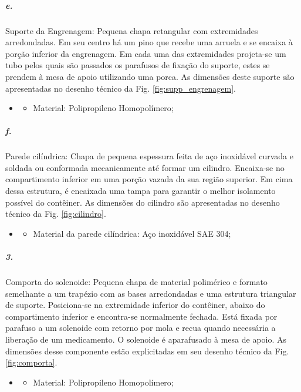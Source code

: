     \subparagraph*{e.} \label{retorno_suporte_engrenagem}
    Suporte da Engrenagem: Pequena chapa retangular com extremidades arredondadas. Em seu centro há um pino que recebe uma arruela e se encaixa à porção inferior da engrenagem. Em cada uma das extremidades projeta-se um tubo pelos quais são passados os parafusos de fixação do suporte, estes se prendem à mesa de apoio utilizando uma porca. As dimensões deste suporte são apresentadas no desenho técnico da Fig. \ref{fig:supp_engrenagem}.
    
    \begin{itemize}
   \item[]
   \begin{itemize}
       \item Material: Polipropileno Homopolímero;
   \end{itemize}
   \end{itemize}
     
   
    \subparagraph*{f.}\label{retorno_cilindro}
    Parede cilíndrica: Chapa de pequena espessura feita de aço inoxidável curvada e soldada ou conformada mecanicamente até formar um cilindro. Encaixa-se no compartimento inferior em uma porção vazada da sua região superior. Em cima dessa estrutura, é encaixada uma tampa para garantir o melhor isolamento possível do contêiner. As dimensões do cilindro são apresentadas no desenho técnico da Fig. \ref{fig:cilindro}.
    \begin{itemize}
   \item[]
   \begin{itemize}
       \item  Material da parede cilíndrica: Aço inoxidável SAE 304;
   \end{itemize}
   \end{itemize}
     
    
    \subparagraph*{3.} \label{retorno_comporta}
    Comporta do solenoide: Pequena chapa de material polimérico e formato semelhante a um trapézio com as bases arredondadas e uma estrutura triangular de suporte. Posiciona-se na extremidade inferior do contêiner, abaixo do compartimento inferior e encontra-se normalmente fechada. Está fixada por parafuso a um solenoide com retorno por mola e recua quando necessária a liberação de um medicamento. O solenoide é aparafusado à mesa de apoio. As dimensões desse componente estão explicitadas em seu desenho técnico da Fig. \ref{fig:comporta}.
    
     \begin{itemize}
   \item[]
   \begin{itemize}
       \item  Material: Polipropileno Homopolímero;
   \end{itemize}
   \end{itemize}
    
